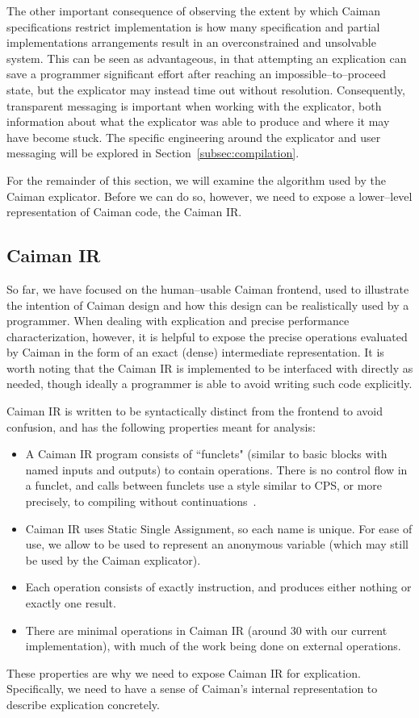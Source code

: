 The other important consequence of observing the extent by which Caiman specifications restrict implementation is how many specification and partial implementations arrangements result in an overconstrained and unsolvable system.  This can be seen as advantageous, in that attempting an explication can save a programmer significant effort after reaching an impossible--to--proceed state, but the explicator may instead time out without resolution.  Consequently, transparent messaging is important when working with the explicator, both information about what the explicator was able to produce and where it may have become stuck.  The specific engineering around the explicator and user messaging will be explored in Section~\ref{subsec:compilation}.

For the remainder of this section, we will examine the algorithm used by the Caiman explicator.  Before we can do so, however, we need to expose a lower--level representation of Caiman code, the Caiman IR.

\subsection{Caiman IR}
\label{subsec:ir}

So far, we have focused on the human--usable Caiman frontend, used to illustrate the intention of Caiman design and how this design can be realistically used by a programmer.  When dealing with explication and precise performance characterization, however, it is helpful to expose the precise operations evaluated by Caiman in the form of an exact (dense) intermediate representation.  It is worth noting that the Caiman IR is implemented to be interfaced with directly as needed, though ideally a programmer is able to avoid writing such code explicitly.

Caiman IR is written to be syntactically distinct from the frontend to avoid confusion, and has the following properties meant for analysis:
%
\begin{itemize}
\item A Caiman IR program consists of ``funclets" (similar to basic blocks with named inputs and outputs) to contain operations.  There is no control flow in a funclet, and calls between funclets use a style similar to CPS, or more precisely, to compiling without continuations~\cite{maurer2017compiling}.
\item Caiman IR uses Static Single Assignment, so each name is unique.  For ease of use, we allow \code{\%_} to be used to represent an anonymous variable (which may still be used by the Caiman explicator).
\item Each operation consists of exactly instruction, and produces either nothing or exactly one result.
\item There are minimal operations in Caiman IR (around 30 with our current implementation), with much of the work being done on external operations.
\end{itemize}
%
These properties are why we need to expose Caiman IR for explication.  Specifically, we need to have a sense of Caiman's internal representation to describe explication concretely.  

